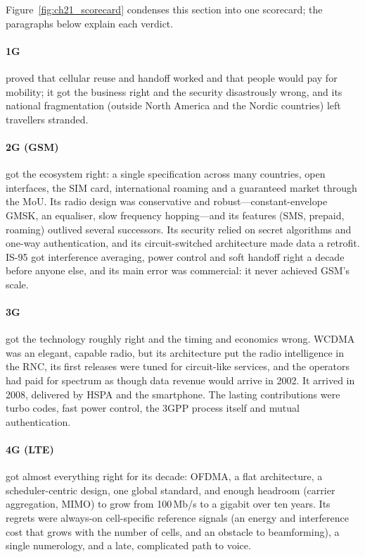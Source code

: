 Figure~\ref{fig:ch21_scorecard} condenses this section into one scorecard; the paragraphs below
explain each verdict.


\paragraph{1G} proved that cellular reuse and handoff worked and that people would pay for mobility;
it got the business right and the security disastrously wrong, and its national fragmentation
(outside North America and the Nordic countries) left travellers stranded.

\paragraph{2G (GSM)} got the ecosystem right: a single specification across many countries, open
interfaces, the SIM card, international roaming and a guaranteed market through the MoU. Its radio
design was conservative and robust---constant-envelope GMSK, an equaliser, slow frequency
hopping---and its features (SMS, prepaid, roaming) outlived several successors. Its security relied
on secret algorithms and one-way authentication, and its circuit-switched architecture made data a
retrofit. IS-95 got interference averaging, power control and soft handoff right a decade before
anyone else, and its main error was commercial: it never achieved GSM's scale.

\paragraph{3G} got the technology roughly right and the timing and economics wrong. WCDMA was an
elegant, capable radio, but its architecture put the radio intelligence in the RNC, its first
releases were tuned for circuit-like services, and the operators had paid for spectrum as though data
revenue would arrive in 2002. It arrived in 2008, delivered by HSPA and the smartphone. The lasting
contributions were turbo codes, fast power control, the 3GPP process itself and mutual
authentication.

\paragraph{4G (LTE)} got almost everything right for its decade: OFDMA, a flat architecture, a
scheduler-centric design, one global standard, and enough headroom (carrier aggregation, MIMO) to
grow from 100\,Mb/s to a gigabit over ten years. Its regrets were always-on cell-specific reference
signals (an energy and interference cost that grows with the number of cells, and an obstacle to
beamforming), a single numerology, and a late, complicated path to voice.

